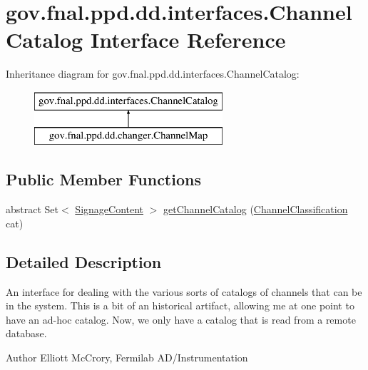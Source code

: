 \hypertarget{interfacegov_1_1fnal_1_1ppd_1_1dd_1_1interfaces_1_1ChannelCatalog}{\section{gov.\-fnal.\-ppd.\-dd.\-interfaces.\-Channel\-Catalog Interface Reference}
\label{interfacegov_1_1fnal_1_1ppd_1_1dd_1_1interfaces_1_1ChannelCatalog}
}
Inheritance diagram for gov.\-fnal.\-ppd.\-dd.\-interfaces.\-Channel\-Catalog\-:\begin{figure}[H]
\begin{center}
\leavevmode
\includegraphics[height=2.000000cm]{interfacegov_1_1fnal_1_1ppd_1_1dd_1_1interfaces_1_1ChannelCatalog}
\end{center}
\end{figure}
\subsection*{Public Member Functions}
\begin{DoxyCompactItemize}
\item 
abstract Set$<$ \hyperlink{interfacegov_1_1fnal_1_1ppd_1_1dd_1_1signage_1_1SignageContent}{Signage\-Content} $>$ \hyperlink{interfacegov_1_1fnal_1_1ppd_1_1dd_1_1interfaces_1_1ChannelCatalog_ad80585eea22d7939113a225e4f63a929}{get\-Channel\-Catalog} (\hyperlink{classgov_1_1fnal_1_1ppd_1_1dd_1_1changer_1_1ChannelClassification}{Channel\-Classification} cat)
\end{DoxyCompactItemize}


\subsection{Detailed Description}
An interface for dealing with the various sorts of catalogs of channels that can be in the system. This is a bit of an historical artifact, allowing me at one point to have an ad-\/hoc catalog. Now, we only have a catalog that is read from a remote database.

\begin{DoxyAuthor}{Author}
Elliott Mc\-Crory, Fermilab A\-D/\-Instrumentation 
\end{DoxyAuthor}


